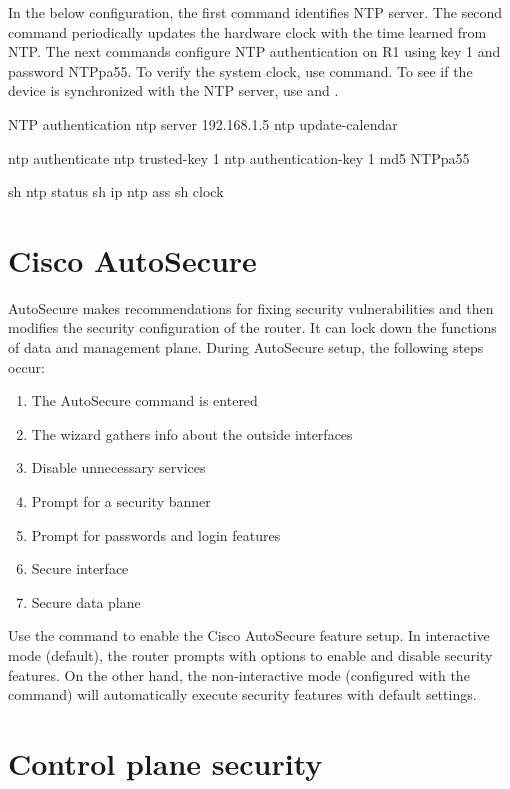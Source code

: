 In the below configuration, the first command identifies NTP server.  The second command periodically updates the hardware clock with the time learned from NTP. The next commands configure NTP authentication on R1 using key 1 and password NTPpa55. To verify the system clock, use  command. To see if the device is synchronized with the NTP server, use  and .

\begin{sexylisting}{NTP authentication}
ntp server 192.168.1.5
ntp update-calendar

ntp authenticate
ntp trusted-key 1
ntp authentication-key 1 md5 NTPpa55

sh ntp status
sh ip ntp ass
sh clock
\end{sexylisting}

\section{Cisco AutoSecure}

AutoSecure makes recommendations for fixing security vulnerabilities and then modifies the security configuration of the router. It can lock down the functions of data and management plane. During AutoSecure setup, the following steps occur:

\begin{enumerate}
\item The AutoSecure command is entered
\item The wizard gathers info about the outside interfaces
\item Disable unnecessary services
\item Prompt for a security banner
\item Prompt for passwords and login features
\item Secure interface
\item Secure data plane
\end{enumerate}

Use the  command to enable the Cisco AutoSecure feature setup. In interactive mode (default), the router prompts with options to enable and disable security features. On the other hand, the non-interactive mode (configured with the  command) will automatically execute security features with default settings.

\section{Control plane security}

